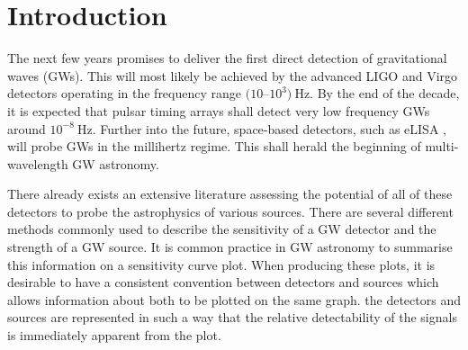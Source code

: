 \section{Introduction}


The next few years promises to deliver the first direct detection of gravitational waves (GWs). This will most likely be achieved by the advanced LIGO \citep{2010CQGra..27h4006H} and Virgo \citep{Accadia2011} detectors operating in the frequency range $(10$--$10^{3})~\mathrm{Hz}$. By the end of the decade, it is expected that pulsar timing arrays \citep{1990ApJ361300F} shall detect very low frequency GWs around $10^{-8}~\mathrm{Hz}$. Further into the future, space-based detectors, such as eLISA \citep{2012CQGra..29l4016A}, will probe GWs in the millihertz regime. This shall herald the beginning of multi-wavelength GW astronomy.

There already exists an extensive literature assessing the potential of all of these detectors to probe the astrophysics of various sources. There are several different methods commonly used to describe the sensitivity of a GW detector and the strength of a GW source. It is common practice in GW astronomy to summarise this information on a sensitivity curve plot. When producing these plots, it is desirable to have a consistent convention between detectors and sources which allows information about both to be plotted on the same graph.  the detectors and sources are represented in such a way that the relative detectability of the signals is immediately apparent from the plot.

